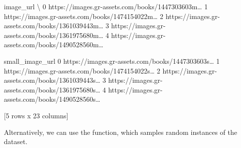 \documentclass[letterpaper,10pt,english]{sphinxmanual}
\begin{document}
{\begin{sphinxVerbatim}[commandchars=\\\{\}]
                                           image\_url  \textbackslash{}
0  https://images.gr-assets.com/books/1447303603m{\ldots}
1  https://images.gr-assets.com/books/1474154022m{\ldots}
2  https://images.gr-assets.com/books/1361039443m{\ldots}
3  https://images.gr-assets.com/books/1361975680m{\ldots}
4  https://images.gr-assets.com/books/1490528560m{\ldots}

                                     small\_image\_url
0  https://images.gr-assets.com/books/1447303603s{\ldots}
1  https://images.gr-assets.com/books/1474154022s{\ldots}
2  https://images.gr-assets.com/books/1361039443s{\ldots}
3  https://images.gr-assets.com/books/1361975680s{\ldots}
4  https://images.gr-assets.com/books/1490528560s{\ldots}

[5 rows x 23 columns]
\end{sphinxVerbatim}
}

Alternatively, we can use the  function, which samples  random instances of the dataset.

{
\begin{sphinxVerbatim}[commandchars=\\\{\}]
\llap{\color{nbsphinxin}[9]:\,\hspace{\fboxrule}\hspace{\fboxsep}} 
\end{sphinxVerbatim}
}
\end{document}
